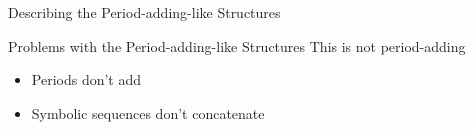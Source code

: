\begin{frame}{Describing the Period-adding-like Structures}
	\vspace{-1em}
	\begin{figure}
	\end{figure}
\end{frame}

\begin{frame}{Problems with the Period-adding-like Structures}
	This is not period-adding
	\pause
	\begin{itemize}
		\item Periods don't add \pause
		\item Symbolic sequences don't concatenate
	\end{itemize}
\end{frame}
